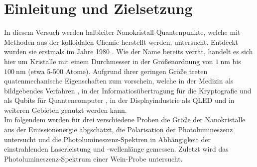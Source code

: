 \section{Einleitung und Zielsetzung}
\label{sec:Ziel}
In diesem Versuch werden halbleiter Nanokristall-Quantenpunkte, welche mit Methoden
aus der kolloidalen Chemie herstellt werden, untersucht. Entdeckt wurden sie erstmals
im Jahre 1980 \cite{eki}. Wie der Name bereits verrät, handelt es sich hier um
Kristalle mit einem Durchmesser in der Größenordnung von $\SI{1}{\nano\meter}$ bis
$\SI{100}{\nano\meter}$ (etwa 5-500 Atome). Aufgrund ihrer geringen Größe treten
quatenmechanische Eigenschaften zum vorschein, welche in der Medizin als bildgebendes
Verfahren \cite{biom}, in der Informatiosübertragung für die Kryptografie \cite{cryp}
und als Qubits für Quantencomputer \cite{compt}, in der Displayindustrie als QLED
\cite{qled} und in weiteren Gebieten genutzt werden kann.\\
Im folgendem werden für drei verschiedene Proben die Größe der Nanokristalle aus
der Emissionenergie abgschätzt, die Polarisation der Photolumineszenz untersucht
und die Photolumineszenz-Spektren in Abhängigkeit der einstrahlenden Laserleistung
und -wellenlänge gemessen. Zuletzt wird das Photolumineszenz-Spektrum einer Wein-Probe
untersucht.
